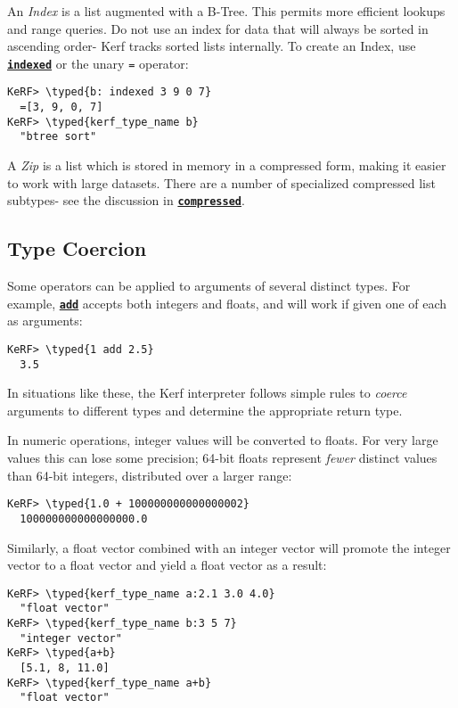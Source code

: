 \documentclass{article}
\newcommand{\typed}[1]{\textcolor{TealBlue}{#1}}
\newcommand{\primu}[2]{\hyperref[prim:#2]{\textbf{\texttt{#1}}}}
\newcommand{\prim}[1]{\primu{#1}{#1}}
\begin{document}
\vspace{0.5cm}

An \emph{Index} is a list augmented with a B-Tree. This permits more efficient lookups and range queries. Do not use an index for data that will always be sorted in ascending order- Kerf tracks sorted lists internally. To create an Index, use \prim{indexed} or the unary \texttt{=} operator:
\begin{Verbatim}
KeRF> \typed{b: indexed 3 9 0 7}
  =[3, 9, 0, 7]
KeRF> \typed{kerf_type_name b}
  "btree sort"
\end{Verbatim}

A \emph{Zip} is a list which is stored in memory in a compressed form, making it easier to work with large datasets. There are a number of specialized compressed list subtypes- see the discussion in \prim{compressed}.

\pagebreak
\subsection{Type Coercion}
Some operators can be applied to arguments of several distinct types. For example, \prim{add} accepts both integers and floats, and will work if given one of each as arguments:
\begin{Verbatim}
KeRF> \typed{1 add 2.5}
  3.5
\end{Verbatim}
In situations like these, the Kerf interpreter follows simple rules to \emph{coerce} arguments to different types and determine the appropriate return type.

\vspace{0.5cm}

In numeric operations, integer values will be converted to floats. For very large values this can lose some precision; 64-bit floats represent \emph{fewer} distinct values than 64-bit integers, distributed over a larger range:
\begin{Verbatim}
KeRF> \typed{1.0 + 100000000000000002}
  100000000000000000.0
\end{Verbatim}

Similarly, a float vector combined with an integer vector will promote the integer vector to a float vector and yield a float vector as a result:
\begin{Verbatim}
KeRF> \typed{kerf_type_name a:2.1 3.0 4.0}
  "float vector"
KeRF> \typed{kerf_type_name b:3 5 7}
  "integer vector"
KeRF> \typed{a+b}
  [5.1, 8, 11.0]
KeRF> \typed{kerf_type_name a+b}
  "float vector"
\end{Verbatim}
\end{document}
